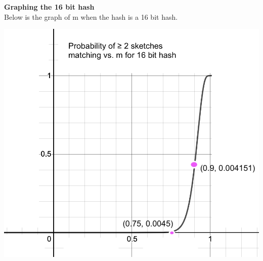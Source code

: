 \documentclass[11pt, solution, letterpaper]{format}
\begin{document}
\textbf{Graphing the 16 bit hash}\\
Below is the graph of m when the hash is a 16 bit hash.\\
\begin{center}\includegraphics[scale=.5]{16bit.png}\end{center}
\end{document}
